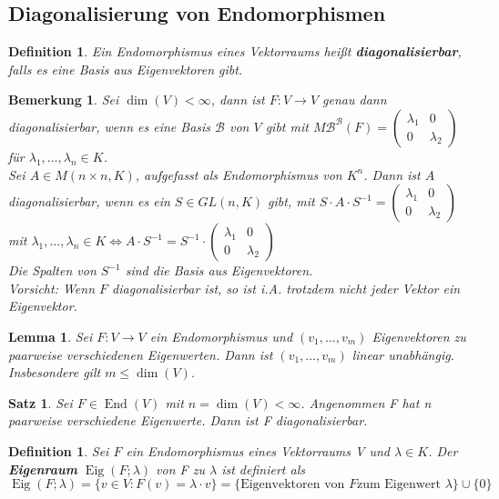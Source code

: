 \documentclass[12pt,a4paper]{article}
\theoremstyle{plain}
\newtheorem{Satz}[Theorem]{Satz}
\newtheorem{Lemma}[Theorem]{Lemma}
\newtheorem{Definition}[Theorem]{Definition}
\newtheorem{Bemerkung}[Theorem]{Bemerkung}
\newcommand{\herv}[1]{{\emph{\textbf{#1}}}}
\numberwithin{equation}{section}
\begin{document}
\subsection{Diagonalisierung von Endomorphismen}
\begin{Definition}
Ein Endomorphismus eines Vektorraums heißt \herv{diagonalisierbar}, falls es eine Basis aus Eigenvektoren gibt.
\end{Definition}
\begin{Bemerkung}
Sei $\dim(V)<\infty$, dann ist $F:V\rightarrow V$ genau dann diagonalisierbar, wenn es eine Basis $\mathcal{B}$ von $V$ gibt mit $M\mathcal{B}^\mathcal{B}(F)=\begin{pmatrix}
\lambda_1 & 0 \\ 0 & \lambda_2 \end{pmatrix}$ für $\lambda_1,\ldots,\lambda_n\in K$. \\
Sei $A\in M(n\times n, K)$, aufgefasst als Endomorphismus von $K^n$. Dann ist $A$ diagonalisierbar, wenn es ein $S\in GL(n,K)$ gibt, mit  $S\cdot A\cdot S^{-1} = \begin{pmatrix}
\lambda_1 & 0 \\ 0 &\lambda_2 \end{pmatrix}$ mit $\lambda_1,\ldots,\lambda_n \in K \Leftrightarrow A\cdot S^{-1} = S^{-1}\cdot\begin{pmatrix} \lambda_1 & 0 \\ 0 &\lambda_2 \end{pmatrix}$ \\
Die Spalten von $S^{-1}$ sind die Basis aus Eigenvektoren. \\
Vorsicht: Wenn $F$ diagonalisierbar ist, so ist i.A. trotzdem nicht jeder Vektor ein Eigenvektor.
\end{Bemerkung}
\begin{Lemma}
Sei $F:V\rightarrow V$ ein Endomorphismus und $(v_1,\ldots,v_m)$ Eigenvektoren zu paarweise verschiedenen Eigenwerten. Dann ist $(v_1,\ldots,v_m)$ linear unabhängig. Insbesondere gilt $m\leq \dim(V)$.
\end{Lemma}
\begin{Satz}
Sei $F\in \operatorname{End}(V)$ mit $n=\dim(V)<\infty$. Angenommen F hat n paarweise verschiedene Eigenwerte. Dann ist F diagonalisierbar.
\end{Satz}
\begin{Definition} Sei $F$ ein Endomorphismus eines Vektorraums V und $\lambda \in K$. Der \herv{Eigenraum} $\operatorname{Eig}(F;\lambda)$ von F zu $\lambda$ ist definiert als \[
\operatorname{Eig}(F;\lambda)=\{v\in V: F(v)=\lambda\cdot v\}=\{\text{Eigenvektoren von }F\text{zum Eigenwert }\lambda\}\cup \{0\}
\]
\end{Definition}
\end{document}

